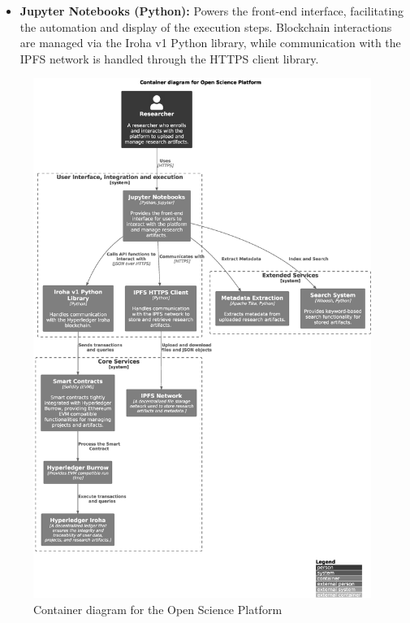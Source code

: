 \documentclass{article}
\begin{document}
\begin{itemize}
      \item \textbf{Jupyter Notebooks (Python):} Powers the front-end interface, facilitating the automation and display of the execution steps. Blockchain interactions are managed via the Iroha v1 Python library, while communication with the IPFS network is handled through the HTTPS client library.
\end{itemize}

\begin{figure}[htbp]
      \centering
      \includegraphics[width=0.98\textwidth, keepaspectratio]{c4_container_diagram}
      \caption{Container diagram for the Open Science Platform}
      \label{fig:c4_container_diagram}
\end{figure}
\end{document}
